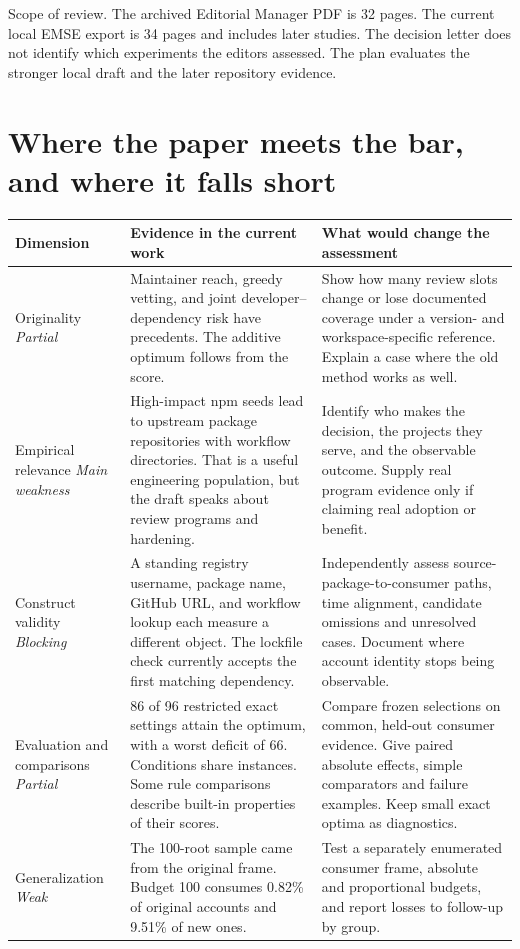 \documentclass[11pt,a4paper]{article}
\newcommand{\pg}[1]{\newpage\section{\color{ink}#1}}
\begin{document}
\small\textcolor{muted}{Scope of review. The archived Editorial Manager PDF is 32 pages. The current local EMSE export is 34 pages and includes later studies. The decision letter does not identify which experiments the editors assessed. The plan evaluates the stronger local draft and the later repository evidence.}
\pg{Where the paper meets the bar, and where it falls short}
\small
\renewcommand{\arraystretch}{1.17}
\begin{tabularx}{\linewidth}{@{}p{.19\linewidth}XX@{}}
\toprule
Dimension & Evidence in the current work & What would change the assessment\\\midrule
Originality \newline \textit{Partial} & Maintainer reach, greedy vetting, and joint developer--dependency risk have precedents. The additive optimum follows from the score. & Show how many review slots change or lose documented coverage under a version- and workspace-specific reference. Explain a case where the old method works as well.\\
Empirical relevance \newline \textit{Main weakness} & High-impact npm seeds lead to upstream package repositories with workflow directories. That is a useful engineering population, but the draft speaks about review programs and hardening. & Identify who makes the decision, the projects they serve, and the observable outcome. Supply real program evidence only if claiming real adoption or benefit.\\
Construct validity \newline \textit{Blocking} & A standing registry username, package name, GitHub URL, and workflow lookup each measure a different object. The lockfile check currently accepts the first matching dependency. & Independently assess source-package-to-consumer paths, time alignment, candidate omissions and unresolved cases. Document where account identity stops being observable.\\
Evaluation and comparisons \newline \textit{Partial} & 86 of 96 restricted exact settings attain the optimum, with a worst deficit of 66. Conditions share instances. Some rule comparisons describe built-in properties of their scores. & Compare frozen selections on common, held-out consumer evidence. Give paired absolute effects, simple comparators and failure examples. Keep small exact optima as diagnostics.\\
Generalization \newline \textit{Weak} & The 100-root sample came from the original frame. Budget 100 consumes 0.82\% of original accounts and 9.51\% of new ones. & Test a separately enumerated consumer frame, absolute and proportional budgets, and report losses to follow-up by group.\\

\end{tabularx}
\end{document}
